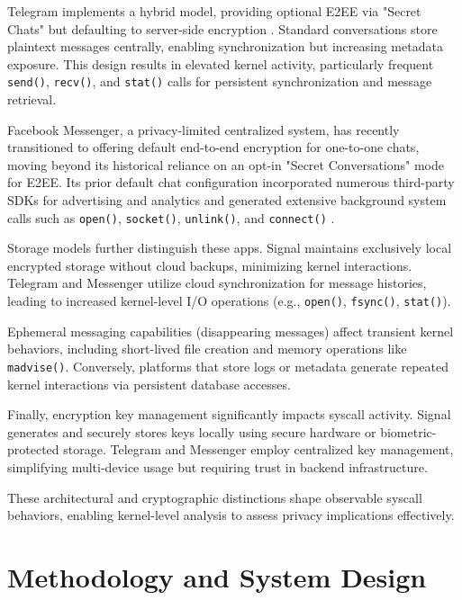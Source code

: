 \documentclass[a4paper,12pt]{report}
\begin{document}
Telegram implements a hybrid model, providing optional E2EE via "Secret Chats" but defaulting to server-side encryption \cite{moltchanov2018telegram}. Standard conversations store plaintext messages centrally, enabling synchronization but increasing metadata exposure. This design results in elevated kernel activity, particularly frequent \texttt{send()}, \texttt{recv()}, and \texttt{stat()} calls for persistent synchronization and message retrieval.

Facebook Messenger, a privacy-limited centralized system, has recently transitioned to offering default end-to-end encryption for one-to-one chats, moving beyond its historical reliance on an opt-in "Secret Conversations" mode for E2EE. Its prior default chat configuration incorporated numerous third-party SDKs for advertising and analytics and generated extensive background system calls such as \texttt{open()}, \texttt{socket()}, \texttt{unlink()}, and \texttt{connect()} \cite{ShenVervierStringhini2021}.

Storage models further distinguish these apps. Signal maintains exclusively local encrypted storage without cloud backups, minimizing kernel interactions. Telegram and Messenger utilize cloud synchronization for message histories, leading to increased kernel-level I/O operations (e.g., \texttt{open()}, \texttt{fsync()}, \texttt{stat()}).

Ephemeral messaging capabilities (disappearing messages) affect transient kernel behaviors, including short-lived file creation and memory operations like \texttt{madvise()}. Conversely, platforms that store logs or metadata generate repeated kernel interactions via persistent database accesses.

Finally, encryption key management significantly impacts syscall activity. Signal generates and securely stores keys locally using secure hardware or biometric-protected storage. Telegram and Messenger employ centralized key management, simplifying multi-device usage but requiring trust in backend infrastructure.

These architectural and cryptographic distinctions shape observable syscall behaviors, enabling kernel-level analysis to assess privacy implications effectively.
\chapter{Methodology and System Design}
\end{document}
